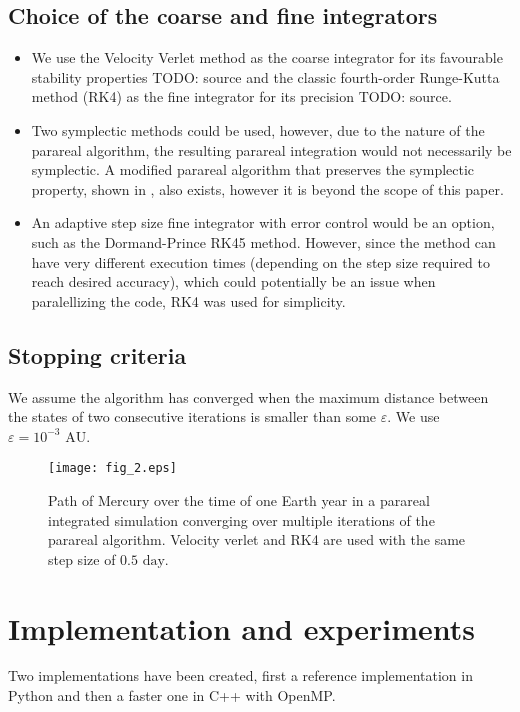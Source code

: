 \documentclass[conference]{IEEEtran}
\begin{document}
\subsection{Choice of the coarse and fine integrators}
\begin{itemize}
    \item We use the Velocity Verlet method as the coarse integrator for its favourable stability properties {\color{red} TODO: source} and the classic fourth-order Runge-Kutta method (RK4) as the fine integrator for its precision {\color{red} TODO: source}. 
    \item Two symplectic methods could be used, however, due to the nature of the parareal algorithm, the resulting parareal integration would not necessarily be symplectic. A modified parareal algorithm that preserves the symplectic property, shown in \cite{symplecticparareal}, also exists, however it is beyond the scope of this paper.
    \item An adaptive step size fine integrator with error control would be an option, such as the Dormand-Prince RK45 method. However, since the method can have very different execution times (depending on the step size required to reach desired accuracy), which could potentially be an issue when paralellizing the code, RK4 was used for simplicity.
\end{itemize}

\subsection{Stopping criteria}
We assume the algorithm has converged when the maximum distance between the states of two consecutive iterations is smaller than some $\varepsilon$. We use $\varepsilon = 10^{-3}\text{ AU}$.

\begin{figure}[htbp]
\centerline{\texttt{[image: fig\_2.eps]}}
\caption{Path of Mercury over the time of one Earth year in a parareal integrated simulation converging over multiple iterations of the parareal algorithm. Velocity verlet and RK4 are used with the same step size of $0.5\text{ day}$.}
\label{mercury}
\end{figure}

\section{Implementation and experiments}
Two implementations have been created, first a reference implementation in Python and then a faster one in C++ with OpenMP. 
\end{document}
